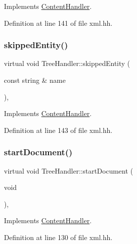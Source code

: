 Implements \mbox{\hyperlink{class_content_handler_a4b01bbac0e89948eb931c30f826db443}{Content\+Handler}}.



Definition at line 141 of file xml.\+hh.

\mbox{\label{class_tree_handler_a4255e1d0d2663ac73b752ee1c82de371}} 
\subsubsection{\texorpdfstring{skippedEntity()}{skippedEntity()}}
{\footnotesize\ttfamily virtual void Tree\+Handler\+::skipped\+Entity (\begin{DoxyParamCaption}\item[{const string \&}]{name }\end{DoxyParamCaption})\hspace{0.3cm}{\ttfamily [inline]}, {\ttfamily [virtual]}}



Implements \mbox{\hyperlink{class_content_handler_a5d5a40349d86c051c980c1e81cf7ab4c}{Content\+Handler}}.



Definition at line 143 of file xml.\+hh.

\mbox{\label{class_tree_handler_a07e8d7c372805a366c14683f4d4a0cb3}} 
\subsubsection{\texorpdfstring{startDocument()}{startDocument()}}
{\footnotesize\ttfamily virtual void Tree\+Handler\+::start\+Document (\begin{DoxyParamCaption}\item[{void}]{ }\end{DoxyParamCaption})\hspace{0.3cm}{\ttfamily [inline]}, {\ttfamily [virtual]}}



Implements \mbox{\hyperlink{class_content_handler_a7f68f6c0e6f33654c3be999a8da17138}{Content\+Handler}}.



Definition at line 130 of file xml.\+hh.

